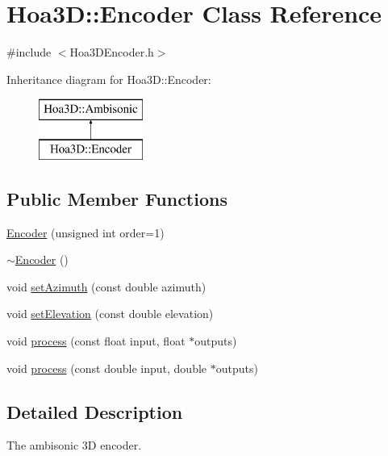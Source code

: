 \hypertarget{class_hoa3_d_1_1_encoder}{\section{Hoa3\-D\-:\-:Encoder Class Reference}
\label{class_hoa3_d_1_1_encoder}
}


{\ttfamily \#include $<$Hoa3\-D\-Encoder.\-h$>$}

Inheritance diagram for Hoa3\-D\-:\-:Encoder\-:\begin{figure}[H]
\begin{center}
\leavevmode
\includegraphics[height=2.000000cm]{class_hoa3_d_1_1_encoder}
\end{center}
\end{figure}
\subsection*{Public Member Functions}
\begin{DoxyCompactItemize}
\item 
\hyperlink{class_hoa3_d_1_1_encoder_a4373c47129b9071bf628e47ce4bd39ce}{Encoder} (unsigned int order=1)
\item 
\hyperlink{class_hoa3_d_1_1_encoder_a9842ee9f5abcba58a05a98dbfdff1b15}{$\sim$\-Encoder} ()
\item 
void \hyperlink{class_hoa3_d_1_1_encoder_a7dbf4d5791003ed486fc0b5462409e0a}{set\-Azimuth} (const double azimuth)
\item 
void \hyperlink{class_hoa3_d_1_1_encoder_a3bf01c6ecd90108c66c19ce7e5bde97d}{set\-Elevation} (const double elevation)
\item 
void \hyperlink{class_hoa3_d_1_1_encoder_aedcd6cc5a50c85f373c61137e452a9b4}{process} (const float input, float $\ast$outputs)
\item 
void \hyperlink{class_hoa3_d_1_1_encoder_a6a8a7c7219424dd74bb5180a5b2c25e3}{process} (const double input, double $\ast$outputs)
\end{DoxyCompactItemize}


\subsection{Detailed Description}
The ambisonic 3\-D encoder.


